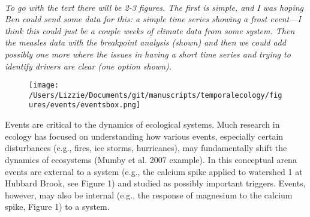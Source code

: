 \documentclass[11pt,a4paper,oneside]{article}
\begin{document}
\newpage
{} \\
\noindent \emph{To go with the text there will be 2-3 figures. The first is simple, and I was hoping Ben could send some data for this: a simple time series showing a frost event---I think this could just be a couple weeks of climate data from some system. Then the measles data with the breakpoint analysis (shown) and then we could add possibly one more where the issues in having a short time series and trying to identify drivers are clear (one option shown). }\\
\begin{figure}[h!]
\centering
\noindent \texttt{[image: /Users/Lizzie/Documents/git/manuscripts/temporalecology/figures/events/eventsbox.png]}
\end{figure}
\newpage
Events are critical to the dynamics of ecological systems. Much research in ecology has focused on understanding how various events, especially certain disturbances (e.g., fires, ice storms, hurricanes), may fundamentally shift the dynamics of ecosystems (Mumby et al. 2007 example). In this conceptual arena events are external to a system (e.g., the calcium spike applied to watershed 1 at Hubbard Brook, see Figure 1) and studied as possibly important triggers. Events, however, may also be internal (e.g., the response of magnesium to the calcium spike, Figure 1) to a system.\\
\end{document}
